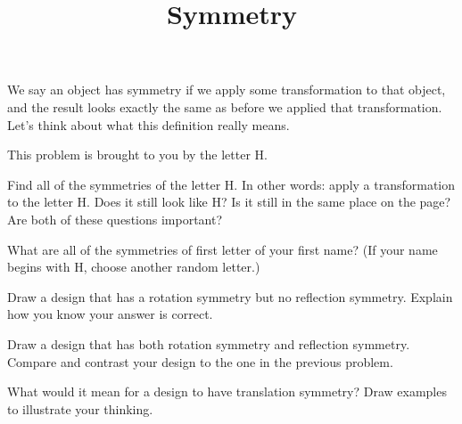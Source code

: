 \documentclass{ximera}
\title{Symmetry}
\begin{document}
\begin{abstract}

\end{abstract}
\maketitle

We say an object has symmetry if we apply some transformation to that object, and the result looks exactly the same as before we applied that transformation.  Let's think about what this definition really means.



\begin{problem}
This problem is brought to you by the letter H.
\begin{image}
\end{image}
Find all of the symmetries of the letter H.  In other words: apply a transformation to the letter H.  Does it still look like H?  Is it still in the same place on the page?  Are both of these questions important?

\end{problem}

\begin{problem}
What are all of the symmetries of first letter of your first name?  (If your name begins with H, choose another random letter.)

\end{problem}



\begin{problem}
Draw a design that has a rotation symmetry but no reflection symmetry. Explain how you know your answer is correct.
\end{problem}


\begin{problem}
Draw a design that has both rotation symmetry and reflection symmetry. Compare and contrast your design to the one in the previous problem.
\end{problem}


\begin{problem}
What would it mean for a design to have translation symmetry? Draw examples to illustrate your thinking.
\end{problem}
\end{document}
